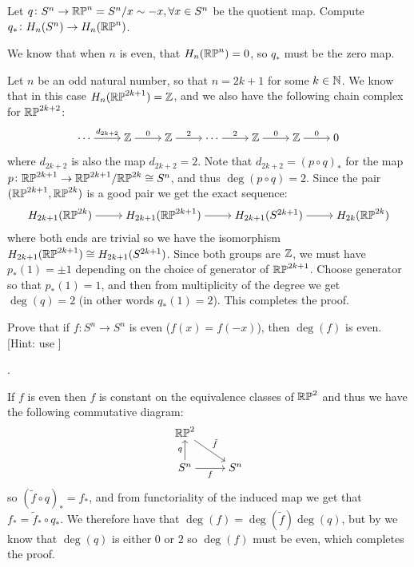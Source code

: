 \documentclass[11pt,a4paper]{article}
\begin{document}
\begin{exercise}
  \label{ex:three-nineteen}
  Let $q \colon S^n \to \mathbb{RP}^{n} = S^n/x \sim -x, \forall x \in S^n$
  be the quotient map.
  Compute $q_* \colon H_n(S^n) \to H_n(\mathbb{RP}^n)$.
\end{exercise}
\begin{solution}
  We know that when $n$ is even, that $H_n(\mathbb{RP}^n) = 0$,
  so $q_*$ must be the zero map.

  Let $n$ be an odd natural number, so that $n = 2k + 1$
  for some $k \in \mathbb{N}$.
  We know that in this case $H_n(\mathbb{RP}^{2k + 1}) = \mathbb{Z}$,
  and we also have the following chain complex
  for $\mathbb{RP}^{2k + 2}$:
  \[\begin{tikzcd}[ampersand replacement=\&,cramped]
    \cdots \& \Z \& \Z \& \cdots \& \Z \& \Z \& 0
    \arrow["d_{2k+2}", from=1-1, to=1-2]
    \arrow["0", from=1-2, to=1-3]
    \arrow["2", from=1-3, to=1-4]
    \arrow["2", from=1-4, to=1-5]
    \arrow["0", from=1-5, to=1-6]
    \arrow["0", from=1-6, to=1-7]
  \end{tikzcd}\]
  where $d_{2k+2}$ is also the map $d_{2k+2} = 2$.
  Note that $d_{2k+2} = (p \circ q)_*$
  for the map $p \colon \mathbb{RP}^{2k+1} \to \mathbb{RP}^{2k+1}/\mathbb{RP}^{2k} \cong S^n$,
  and thus $\deg(p \circ q) = 2$.
  Since the pair $(\mathbb{RP}^{2k+1},\mathbb{RP}^{2k})$ is a good pair we get the exact
  sequence:
  \[\begin{tikzcd}[ampersand replacement=\&,cramped]
    {H_{2k+1}(\RP^{2k})} \& {H_{2k+1}(\RP^{2k+1})} \& {H_{2k+1}(S^{2k+1})} \& {H_{2k}(\RP^{2k})}
    \arrow[from=1-1, to=1-2]
    \arrow[from=1-2, to=1-3]
    \arrow[from=1-3, to=1-4]
  \end{tikzcd}\]
  where both ends are trivial so we have the isomorphism
  $H_{2k+1}(\mathbb{RP}^{2k+1}) \cong H_{2k+1}(S^{2k+1})$.
  Since both groups are $\mathbb{Z}$, we must have $p_*(1) = \pm 1$
  depending on the choice of generator of $\mathbb{RP}^{2k+1}$.
  Choose generator so that $p_*(1) = 1$,
  and then from multiplicity of the degree we get $\deg(q) = 2$
  (in other words $q_*(1) = 2$).
  This completes the proof.
\end{solution}

\begin{exercise}
  Prove that if $f \colon S^n \to S^n$ is even ($f(x) = f(-x)$),
  then $\deg(f)$ is even.
  [Hint: use ]
\end{exercise}.
\begin{solution}
  If $f$ is even then $f$ is constant on the equivalence classes
  of $\mathbb{RP}^2$ and thus we have the following commutative diagram:
  \[\begin{tikzcd}[ampersand replacement=\&,cramped]
    {\RP^2} \\
    {S^n} \& {S^n}
    \arrow["{\tilde f}", from=1-1, to=2-2]
    \arrow["q", from=2-1, to=1-1]
    \arrow["f"', from=2-1, to=2-2]
  \end{tikzcd}\]
  so $(\tilde f \circ q)_* = f_*$,
  and from functoriality of the induced map we get that
  $f_* = \tilde f_* \circ q_*$.
  We therefore have that $\deg(f) = \deg(\tilde f) \deg(q)$,
  but by  we know that $\deg(q)$
  is either $0$ or $2$ so $\deg(f)$ must be even,
  which completes the proof.
\end{solution}
\end{document}
